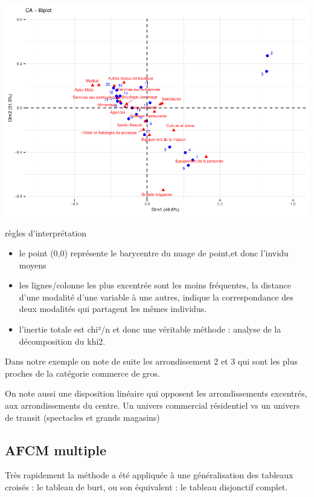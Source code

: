 \documentclass[
]{book}
\providecommand{\tightlist}{%
  \setlength{\itemsep}{0pt}\setlength{\parskip}{0pt}}
\begin{document}
\includegraphics{bookdown-demo_files/figure-latex/0610-1.pdf}

règles d'interprétation

\begin{itemize}
\tightlist
\item
  le point (0,0) représente le barycentre du nuage de point,et donc l'invidu moyens
\item
  les lignes/colonne les plus excentrée sont les moins fréquentes, la distance d'une modalité d'une variable à une autres, indique la correspondance des deux modalités qui partagent les mêmes individus.
\item
  l'inertie totale est chi²/n et donc une véritable méthode : analyse de la décomposition du khi2.
\end{itemize}

Dans notre exemple on note de suite les arrondissement 2 et 3 qui sont les plus proches de la catégorie commerce de gros.

On note aussi une disposition linéaire qui opposent les arrondissements excentrés, aux arrondissements du centre. Un univers commercial résidentiel vs un univers de transit (spectacles et grands magasins)

\hypertarget{afcm-multiple}{%
\subsection{AFCM multiple}\label{afcm-multiple}}

Très rapidement la méthode a été appliquée à une généralisation des tableaux croisés : le tableau de burt, ou son équivalent : le tableau disjonctif complet.
\end{document}

